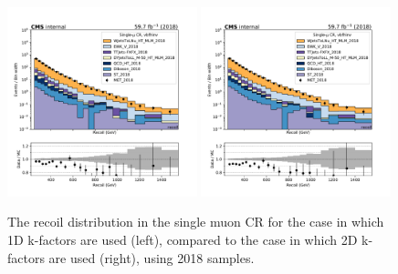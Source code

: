 \begin{figure}
    \begin{center}
        \includegraphics[width=0.49\textwidth]{fig/datamc_1dkfac/cr_1m_vbf/cr_1m_vbf_recoil_losf_2018.pdf}
        \includegraphics[width=0.49\textwidth]{fig/datamc/cr_1m_vbf/cr_1m_vbf_recoil_losf_2018.pdf} 
        \caption{The recoil distribution in the single muon CR for the case in which 1D k-factors are used (left), 
        compared to the case in which 2D k-factors are used (right), using 2018 samples.}
        \label{fig:recoil_2018}
    \end{center}
\end{figure}

